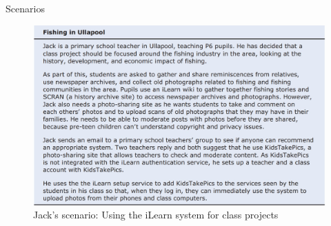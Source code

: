 \documentclass{beamer}
\begin{document}
\begin{frame}{Scenarios}
		\begin{figure}
		\includegraphics[scale=.4]{img/m2_25.jpg}
		\caption{Jack’s scenario: Using the iLearn system for class projects}
	\end{figure}
	
\end{frame}
\end{document}
